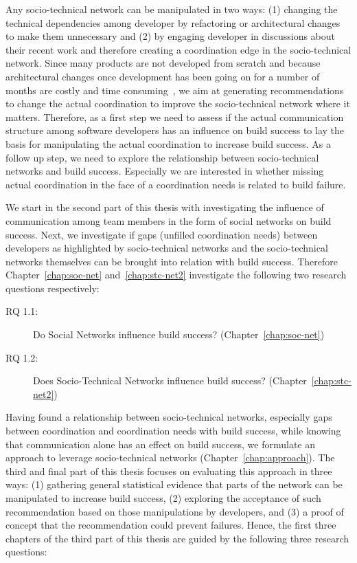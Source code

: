 Any socio-technical network can be manipulated in two ways: (1) changing the technical dependencies among developer by refactoring or architectural changes to make them unnecessary and (2) by engaging developer in discussions about their recent work and therefore creating a coordination edge in the socio-technical network.
Since many products are not developed from scratch and because architectural changes once development has been going on for a number of months are costly and time consuming~\cite{vangurp:jss:2002}, we aim at generating recommendations to change the actual coordination to improve the socio-technical network where it matters.
Therefore, as a first step we need to assess if the actual communication structure among software developers has an influence on build success to lay the basis for manipulating the actual coordination to increase build success.
As a follow up step, we need to explore the relationship between socio-technical networks and build success.
Especially we are interested in whether missing actual coordination in the face of a coordination needs is related to build failure.

We start in the second part of this thesis with investigating the influence of communication among team members in the form of social networks on build success.
Next, we investigate if gaps (unfilled coordination needs) between developers as highlighted by socio-technical networks and the socio-technical networks themselves can be brought into relation with build success.
Therefore Chapter~\ref{chap:soc-net} and~\ref{chap:stc-net2} investigate the following two research questions respectively:

\begin{description}
  \item[RQ 1.1:] Do Social Networks influence build success? (Chapter~\ref{chap:soc-net})
  \item[RQ 1.2:] Does Socio-Technical Networks influence build success? (Chapter~\ref{chap:stc-net2})
\end{description}

Having found a relationship between socio-technical networks, especially gaps between coordination and coordination needs with build success, while knowing that communication alone has an effect on build success, we formulate an approach to leverage socio-technical networks (Chapter~\ref{chap:approach}).
The third and final part of this thesis focuses on evaluating this approach in three ways:
(1) gathering general statistical evidence that parts of the network can be manipulated to increase build success,
(2) exploring the acceptance of such recommendation based on those manipulations by developers,
and (3) a proof of concept that the recommendation could prevent failures.
Hence, the first three chapters of the third part of this thesis are guided by the following three research questions:

